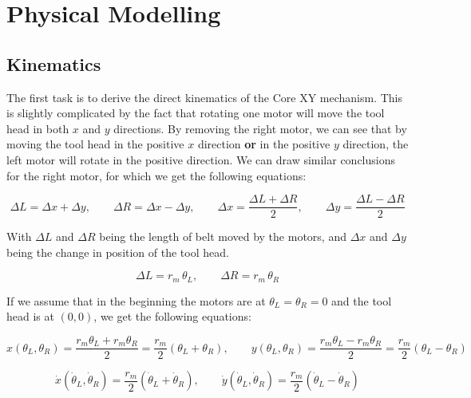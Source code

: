 \section{Physical Modelling}
\label{sec:physical_modelling}

\subsection{Kinematics}
The first task is to derive the direct kinematics of the Core XY mechanism. This is slightly complicated by the fact that rotating one motor will move the tool head in both $x$ and $y$ directions. By removing the right motor, we can see that by moving the tool head in the positive $x$ direction \textbf{or} in the positive $y$ direction, the left motor will rotate in the positive direction. We can draw similar conclusions for the right motor, for which we get the following equations:

\begin{equation}
\label{eq:belt_kinematics}
\Delta L = \Delta x + \Delta y, \qquad
\Delta R = \Delta x - \Delta y, \qquad
\Delta x = \frac{\Delta L + \Delta R}{2}, \qquad
\Delta y = \frac{\Delta L - \Delta R}{2}
\end{equation}

With $\Delta L$ and $\Delta R$ being the length of belt moved by the motors, and $\Delta x$ and $\Delta y$ being the change in position of the tool head.

\begin{equation}
\label{eq:belt_motor}
\Delta L = r_m \, \theta_L, \qquad
\Delta R = r_m \, \theta_R
\end{equation}

If we assume that in the beginning the motors are at
$\theta_L = \theta_R = 0$ and the tool head is at $(0, 0)$, we get the following equations:



\begin{equation}
\label{eq:kinematics}
x(\theta_L, \theta_R) = \frac{r_m \theta_L + r_m \theta_R}{2}
  = \frac{r_m}{2} \left( \theta_L + \theta_R \right), \qquad
y(\theta_L, \theta_R) = \frac{r_m \theta_L - r_m \theta_R}{2}
  = \frac{r_m}{2} \left( \theta_L - \theta_R \right)
\end{equation}

\begin{equation}
\label{eq:kinematics_vel}
\dot{x}(\dot{\theta}_L, \dot{\theta}_R) = \frac{r_m}{2} \left( \dot{\theta}_L + \dot{\theta}_R \right), \qquad
\dot{y}(\dot{\theta}_L, \dot{\theta}_R) = \frac{r_m}{2} \left( \dot{\theta}_L - \dot{\theta}_R \right)
\end{equation}

